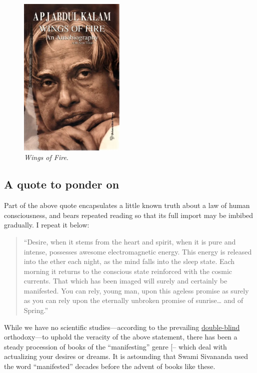 \documentclass[
  a4paper,
]{article}
\begin{document}
\begin{figure}
\centering
\includegraphics[width=0.45\textwidth,height=\textheight]{images/Wings-of-Fire.jpg}
\caption{\emph{Wings of Fire}.}
\end{figure}

\subsection{A quote to ponder on}\label{a-quote-to-ponder-on}

Part of the above quote encapsulates a little known truth about a law of
human consciousness, and bears repeated reading so that its full import
may be imbibed gradually. I repeat it below:

\begin{quote}
``Desire, when it stems from the heart and spirit, when it is pure and
intense, possesses awesome electromagnetic energy. This energy is
released into the ether each night, as the mind falls into the sleep
state. Each morning it returns to the conscious state reinforced with
the cosmic currents. That which has been imaged will surely and
certainly be manifested. You can rely, young man, upon this ageless
promise as surely as you can rely upon the eternally unbroken promise of
sunrise\ldots{} and of Spring.''
\end{quote}

While we have no scientific studies---according to the prevailing
\href{https://dictionary.cambridge.org/dictionary/english/double-blind}{double-blind}
orthodoxy---to uphold the veracity of the above statement, there has
been a steady procession of books of the ``manifesting'' genre
{[}--\citeproc{ref-ferraro2021}{8}{]} which
deal with actualizing your desires or dreams. It is astounding that
Swami Sivananda used the word ``manifested'' decades before the advent
of books like these.
\end{document}
